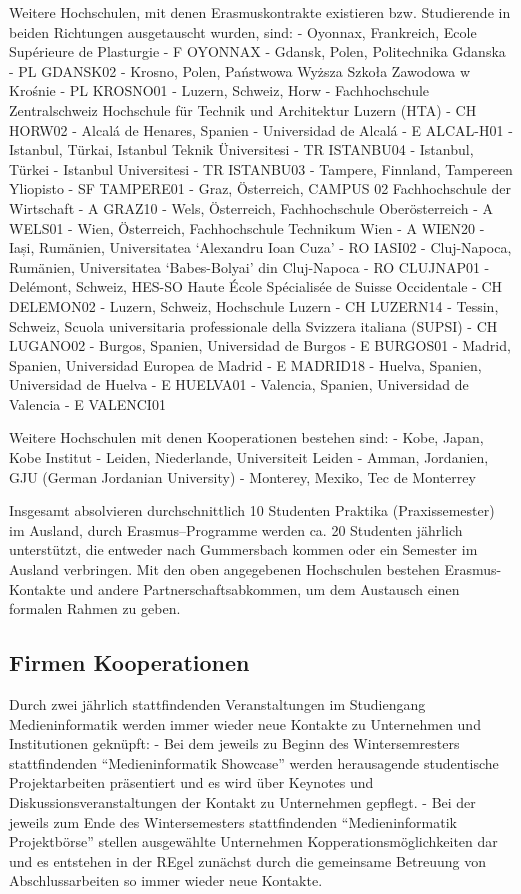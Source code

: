 Weitere Hochschulen, mit denen Erasmuskontrakte existieren bzw.
Studierende in beiden Richtungen ausgetauscht wurden, sind: - Oyonnax,
Frankreich, Ecole Supérieure de Plasturgie - F OYONNAX - Gdansk, Polen,
Politechnika Gdanska - PL GDANSK02 - Krosno, Polen, Państwowa Wyższa
Szkoła Zawodowa w Krośnie - PL KROSNO01 - Luzern, Schweiz, Horw -
Fachhochschule Zentralschweiz Hochschule für Technik und Architektur
Luzern (HTA) - CH HORW02 - Alcalá de Henares, Spanien - Universidad de
Alcalá - E ALCAL-H01 - Istanbul, Türkai, Istanbul Teknik Üniversitesi -
TR ISTANBU04 - Istanbul, Türkei - Istanbul Universitesi - TR ISTANBU03 -
Tampere, Finnland, Tampereen Yliopisto - SF TAMPERE01 - Graz,
Österreich, CAMPUS 02 Fachhochschule der Wirtschaft - A GRAZ10 - Wels,
Österreich, Fachhochschule Oberösterreich - A WELS01 - Wien, Österreich,
Fachhochschule Technikum Wien - A WIEN20 - Iași, Rumänien, Universitatea
`Alexandru Ioan Cuza' - RO IASI02 - Cluj-Napoca, Rumänien, Universitatea
`Babes-Bolyai' din Cluj-Napoca - RO CLUJNAP01 - Delémont, Schweiz,
HES-SO Haute École Spécialisée de Suisse Occidentale - CH DELEMON02 -
Luzern, Schweiz, Hochschule Luzern - CH LUZERN14 - Tessin, Schweiz,
Scuola universitaria professionale della Svizzera italiana (SUPSI) - CH
LUGANO02 - Burgos, Spanien, Universidad de Burgos - E BURGOS01 - Madrid,
Spanien, Universidad Europea de Madrid - E MADRID18 - Huelva, Spanien,
Universidad de Huelva - E HUELVA01 - Valencia, Spanien, Universidad de
Valencia - E VALENCI01

Weitere Hochschulen mit denen Kooperationen bestehen sind: - Kobe,
Japan, Kobe Institut - Leiden, Niederlande, Universiteit Leiden - Amman,
Jordanien, GJU (German Jordanian University) - Monterey, Mexiko, Tec de
Monterrey

Insgesamt absolvieren durchschnittlich 10 Studenten Praktika
(Praxissemester) im Ausland, durch Erasmus--Programme werden ca. 20
Studenten jährlich unterstützt, die entweder nach Gummersbach kommen
oder ein Semester im Ausland verbringen. Mit den oben angegebenen
Hochschulen bestehen Erasmus-Kontakte und andere Partnerschaftsabkommen,
um dem Austausch einen formalen Rahmen zu geben.

\subsection{Firmen Kooperationen}\label{firmen-kooperationen}

Durch zwei jährlich stattfindenden Veranstaltungen im Studiengang
Medieninformatik werden immer wieder neue Kontakte zu Unternehmen und
Institutionen geknüpft: - Bei dem jeweils zu Beginn des Wintersemresters
stattfindenden ``Medieninformatik Showcase'' werden herausagende
studentische Projektarbeiten präsentiert und es wird über Keynotes und
Diskussionsveranstaltungen der Kontakt zu Unternehmen gepflegt. - Bei
der jeweils zum Ende des Wintersemesters stattfindenden
``Medieninformatik Projektbörse'' stellen ausgewählte Unternehmen
Kopperationsmöglichkeiten dar und es entstehen in der REgel zunächst
durch die gemeinsame Betreuung von Abschlussarbeiten so immer wieder
neue Kontakte.

